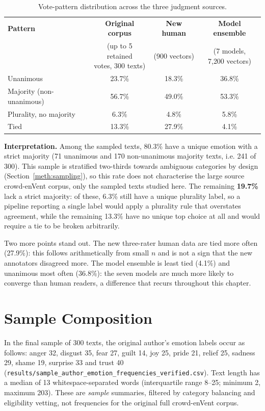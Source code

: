 \begin{table}[h]
\centering
\footnotesize
\caption{Vote-pattern distribution across the three judgment sources.}
\label{tab:votepatterns}
\begin{tabular}{lccc}
\hline
\textbf{Pattern} & \textbf{Original corpus} & \textbf{New human} & \textbf{Model ensemble} \\
 & \shortstack{(up to 5 retained\\votes, 300 texts)} & (900 vectors) & \shortstack{(7 models,\\7{,}200 vectors)} \\
\hline
Unanimous & 23.7\% & 18.3\% & 36.8\% \\
Majority (non-unanimous) & 56.7\% & 49.0\% & 53.3\% \\
Plurality, no majority & 6.3\% & 4.8\% & 5.8\% \\
Tied & 13.3\% & 27.9\% & 4.1\% \\
\hline
\end{tabular}
\end{table}

\noindent
\textbf{Interpretation.} Among the sampled texts, 80.3\% have a unique emotion with a strict
majority (71 unanimous and 170 non-unanimous majority texts, i.e. 241 of 300). This sample is
stratified two-thirds towards ambiguous categories by design
(Section~\ref{meth:sampling}), so this rate does not characterise the large source crowd-enVent
corpus, only the sampled texts studied here. The remaining \textbf{19.7\%} lack a strict majority:
of these, 6.3\% still have a unique plurality label, so a pipeline reporting a single label would
apply a plurality rule that overstates agreement, while the remaining 13.3\% have no unique top
choice at all and would require a tie to be broken arbitrarily.

Two more points stand out. The new three-rater human data are tied more often (27.9\%): this
follows arithmetically from small $n$ and is not a sign that the new annotators disagreed more.
The model ensemble is least tied (4.1\%) and unanimous most often (36.8\%): the seven models are
much more likely to converge than human readers, a difference that recurs throughout this
chapter.

\section{Sample Composition}
\label{res:sampledescription}

\noindent
In the final sample of 300 texts, the original author's emotion labels occur as follows:
anger 32, disgust 35, fear 27, guilt 14, joy 25, pride 21, relief 25, sadness 29,
shame 19, surprise 33 and trust 40 (\texttt{results/\allowbreak sample\_\allowbreak author\_\allowbreak emotion\_\allowbreak frequencies\_\allowbreak verified.csv}).
Text length has a median of 13 whitespace-separated words (interquartile range 8--25;
minimum 2, maximum 203). These are \emph{sample} summaries, filtered by category balancing and
eligibility vetting, not frequencies for the original full crowd-enVent corpus.

